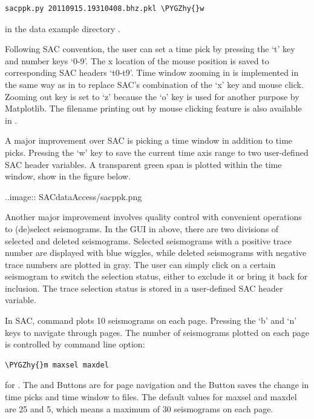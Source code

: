 \documentclass[letterpaper,10pt,english]{sphinxmanual}
\def\PYGZhy{\char`\-}
\begin{document}
\begin{Verbatim}[commandchars=\\\{\}]
sacppk.py 20110915.19310408.bhz.pkl \PYGZhy{}w
\end{Verbatim}

in the data example directory .

Following SAC convention, the user can set a time pick by pressing the `t' key and number keys `0-9'. The x location of the mouse position is saved to corresponding SAC headers `t0-t9'.
Time window zooming in  is implemented in the same way as in  to replace SAC's combination of the `x' key and mouse click.
Zooming out key is set to `z' because the `o' key is used for another purpose by Matplotlib.
The filename printing out by mouse clicking feature is also available in .

A major improvement over SAC is picking a time window in addition to time picks.
Pressing the `w' key to save the current time axis range to two user-defined SAC header variables. A transparent green span is plotted within the time window, show in the figure below.

..image:: SACdataAccess/sacppk.png

Another major improvement involves quality control with convenient operations to (de)select seismograms. In the GUI in above, there are two divisions of selected and deleted seismograms.
Selected seismograms with a positive trace number are displayed with blue wiggles, while deleted seismograms with negative trace numbers are plotted in gray. The user can simply click on a certain seismogram to switch the selection status, either to exclude it or bring it back for inclusion. The trace selection status is stored in a user-defined SAC header variable.

In SAC, command  plots 10 seismograms on each page. Pressing the `b' and `n' keys to navigate through pages. The number of seismograms plotted on each page is controlled by command line option:

\begin{Verbatim}[commandchars=\\\{\}]
\PYGZhy{}m maxsel maxdel
\end{Verbatim}

for . The  and  Buttons are for page navigation and the  Button saves the change in time picks and time window to files. The default values for maxsel and maxdel are 25 and 5, which means a maximum of 30 seismograms on each page.
\end{document}
